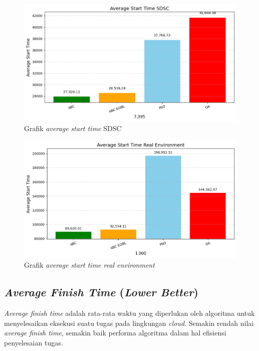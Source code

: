 \newpage

\begin{figure} [H]
    \centering
    \includegraphics[width=0.75\linewidth]{gambar/Grafik Average Start Time SDSC.png}
    \caption{Grafik \textit{average start time} SDSC}
\end{figure}

\begin{figure} [H]
    \centering
    \includegraphics[width=0.75\linewidth]{gambar/Grafik Average Start Time Real Environment.png}
    \caption{Grafik \textit{average start time real environment}}
\end{figure}

\subsection{\textit{Average Finish Time} (\textit{Lower Better})}
\textit{Average finish time} adalah rata-rata waktu yang diperlukan oleh algoritma untuk menyelesaikan eksekusi suatu tugas pada lingkungan \textit{cloud}. Semakin rendah nilai \textit{average finish time}, semakin baik performa algoritma dalam hal efisiensi penyelesaian tugas.

\newpage

